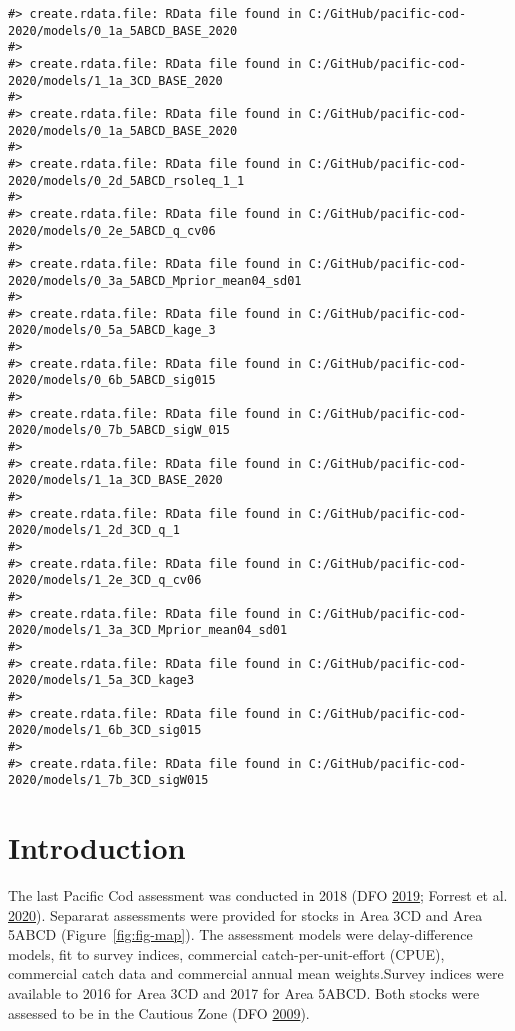 \documentclass[11pt]{book}
\begin{document}
\frontmatter
\begin{verbatim}
#> create.rdata.file: RData file found in C:/GitHub/pacific-cod-2020/models/0_1a_5ABCD_BASE_2020
#> 
#> create.rdata.file: RData file found in C:/GitHub/pacific-cod-2020/models/1_1a_3CD_BASE_2020
#> 
#> create.rdata.file: RData file found in C:/GitHub/pacific-cod-2020/models/0_1a_5ABCD_BASE_2020
#> 
#> create.rdata.file: RData file found in C:/GitHub/pacific-cod-2020/models/0_2d_5ABCD_rsoleq_1_1
#> 
#> create.rdata.file: RData file found in C:/GitHub/pacific-cod-2020/models/0_2e_5ABCD_q_cv06
#> 
#> create.rdata.file: RData file found in C:/GitHub/pacific-cod-2020/models/0_3a_5ABCD_Mprior_mean04_sd01
#> 
#> create.rdata.file: RData file found in C:/GitHub/pacific-cod-2020/models/0_5a_5ABCD_kage_3
#> 
#> create.rdata.file: RData file found in C:/GitHub/pacific-cod-2020/models/0_6b_5ABCD_sig015
#> 
#> create.rdata.file: RData file found in C:/GitHub/pacific-cod-2020/models/0_7b_5ABCD_sigW_015
#> 
#> create.rdata.file: RData file found in C:/GitHub/pacific-cod-2020/models/1_1a_3CD_BASE_2020
#> 
#> create.rdata.file: RData file found in C:/GitHub/pacific-cod-2020/models/1_2d_3CD_q_1
#> 
#> create.rdata.file: RData file found in C:/GitHub/pacific-cod-2020/models/1_2e_3CD_q_cv06
#> 
#> create.rdata.file: RData file found in C:/GitHub/pacific-cod-2020/models/1_3a_3CD_Mprior_mean04_sd01
#> 
#> create.rdata.file: RData file found in C:/GitHub/pacific-cod-2020/models/1_5a_3CD_kage3
#> 
#> create.rdata.file: RData file found in C:/GitHub/pacific-cod-2020/models/1_6b_3CD_sig015
#> 
#> create.rdata.file: RData file found in C:/GitHub/pacific-cod-2020/models/1_7b_3CD_sigW015
\end{verbatim}
\clearpage

\hypertarget{introduction}{%
\section{Introduction}\label{introduction}}

The last Pacific Cod assessment was conducted in 2018 (DFO \protect\hyperlink{ref-dfo2019}{2019}; Forrest et al. \protect\hyperlink{ref-forrest2020}{2020}). Separarat assessments were provided for stocks in Area 3CD and Area 5ABCD (Figure~\ref{fig:fig-map}). The assessment models were delay-difference models, fit to survey indices, commercial catch-per-unit-effort (CPUE), commercial catch data and commercial annual mean weights.Survey indices were available to 2016 for Area 3CD and 2017 for Area 5ABCD. Both stocks were assessed to be in the Cautious Zone (DFO \protect\hyperlink{ref-dfo2009}{2009}).
\end{document}
